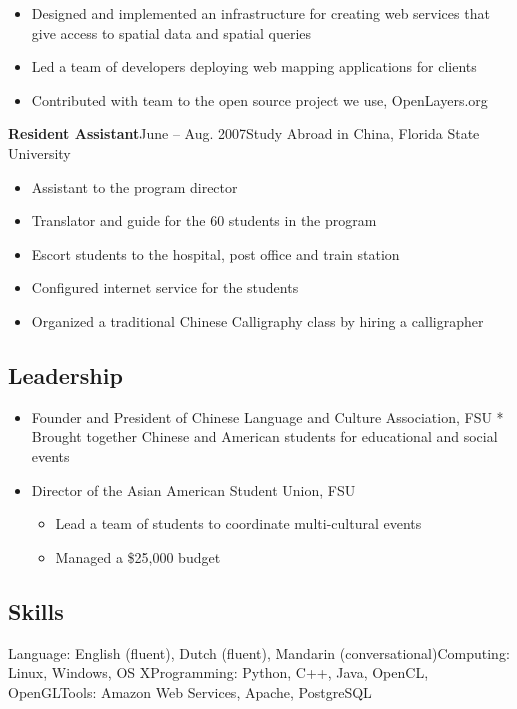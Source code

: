 \documentclass{article}
\begin{document}
\begin{itemize}%
\item Designed and implemented an infrastructure for creating web services that give access to spatial data and spatial queries
\item Led a team of developers deploying web mapping applications for clients
\item Contributed with team to the open source project we use, OpenLayers.org

\end{itemize}
\textbf{Resident Assistant}\newline June – Aug. 2007\newline Study Abroad in China, Florida State University

\begin{itemize}%
\item Assistant to the program director
\item Translator and guide for the 60 students in the program
\item Escort students to the hospital, post office and train station
\item Configured internet service for the students
\item Organized a traditional Chinese Calligraphy class by hiring a calligrapher

\end{itemize}
\hypertarget{leadership}{}\subsection*{{Leadership}}\label{leadership}

\begin{itemize}%
\item Founder and President of Chinese Language and Culture Association, FSU * Brought together Chinese and American students for educational and social events


\item Director of the Asian American Student Union, FSU

\begin{itemize}%
\item Lead a team of students to coordinate multi-cultural events
\item Managed a \$25,000 budget

\end{itemize}


\end{itemize}
\hypertarget{skills}{}\subsection*{{Skills}}\label{skills}

Language: English (fluent), Dutch (fluent), Mandarin (conversational)\newline Computing: Linux, Windows, OS X\newline Programming: Python, C++, Java, OpenCL, OpenGL\newline Tools: Amazon Web Services, Apache, PostgreSQL
\end{document}
